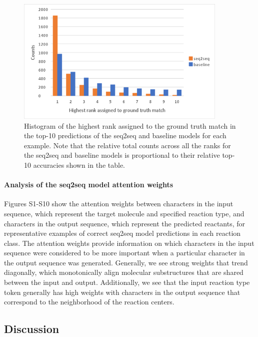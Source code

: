 \begin{figure}
  \centering
  \includegraphics[width=0.9\textwidth]{Images/ret_histograph.png}
  \caption{Histogram of the highest rank assigned to the ground truth match in the top-10 predictions of the seq2seq and baseline models for each example. Note that the relative total counts across all the ranks for the seq2seq and baseline models is proportional to their relative top-10 accuracies shown in the table.}
  \label{fig:ret_table2}
\end{figure}

\paragraph{Analysis of the seq2seq model attention weights}

Figures S1-S10 show the attention weights between characters in the input sequence, which represent the target molecule and specified reaction type, and characters in the output sequence, which represent the predicted reactants, for representative examples of correct seq2seq model predictions in each reaction class. The attention weights provide information on which characters in the input sequence were considered to be more important when a particular character in the output sequence was generated. Generally, we see strong weights that trend diagonally, which monotonically align molecular substructures that are shared between the input and output. Additionally, we see that the input reaction type token generally has high weights with characters in the output sequence that correspond to the neighborhood of the reaction centers.

\subsection{Discussion}

